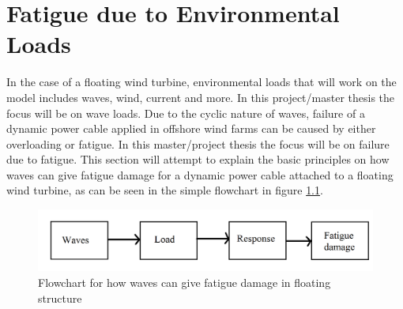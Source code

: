 \chapter{Fatigue due to Environmental Loads}
\label{chap:fatigue}
In the case of a floating wind turbine, environmental loads that will work on the model includes waves, wind, current and more. In this project/master thesis the focus will be on wave loads. Due to the cyclic nature of waves, failure of a dynamic power cable applied in offshore wind farms can be caused by either overloading or fatigue. In this master/project thesis the focus will be on failure due to fatigue. This section will attempt to explain the basic principles on how waves can give fatigue damage for a dynamic power cable attached to a floating wind turbine, as can be seen in the simple flowchart in figure \ref{fig:flowchart}. 

\begin{figure}[h!]
\centering
\includegraphics[scale=0.4]{figures/box}
\caption[$\; \:$Flowchart]{Flowchart for how waves can give fatigue damage in floating structure}
 \label{fig:flowchart}
\end{figure}

